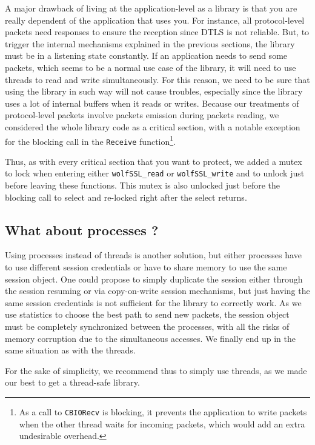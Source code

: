 A major drawback of living at the application-level as a library is that you are really dependent of the application that uses you. For instance, all protocol-level packets need responses to ensure the reception since DTLS is not reliable. But, to trigger the internal mechanisms explained in the previous sections, the library must be in a listening state constantly. If an application needs to send some packets, which seems to be a normal use case of the library, it will need to use threads to read and write simultaneously. For this reason, we need to be sure that using the library in such way will not cause troubles, especially since the library uses a lot of internal buffers when it reads or writes. Because our treatments of protocol-level packets involve packets emission during packets reading, we considered the whole library code as a critical section, with a notable exception for the blocking call in the \texttt{Receive} function\footnote{As a call to \texttt{CBIORecv} is blocking, it prevents the application to write packets when the other thread waits for incoming packets, which would add an extra undesirable overhead.}.

Thus, as with every critical section that you want to protect, we added a mutex to lock when entering either \texttt{wolfSSL\_read} or \texttt{wolfSSL\_write} and to unlock just before leaving these functions. This mutex is also unlocked just before the blocking call to select and re-locked right after the select returns.

\subsection{What about processes ?}

Using processes instead of threads is another solution, but either processes have to use different session credentials or have to share memory to use the same session object. One could propose to simply duplicate the session either through the session resuming or via copy-on-write session mechanisms, but just having the same session credentials is not sufficient for the library to correctly work. As we use statistics to choose the best path to send new packets, the session object must be completely synchronized between the processes, with all the risks of memory corruption due to the simultaneous accesses. We finally end up in the same situation as with the threads.

For the sake of simplicity, we recommend thus to simply use threads, as we made our best to get a thread-safe library.


